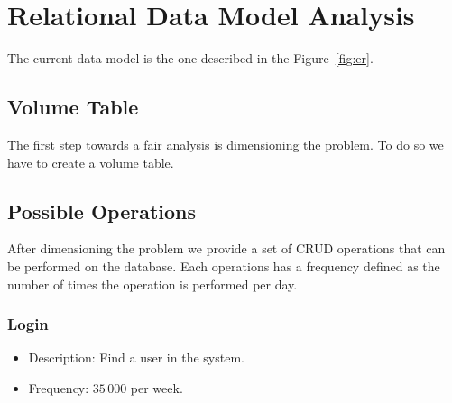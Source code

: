 \section{Relational Data Model Analysis}

The current data model is the one described in the Figure~\ref{fig:er}.

\subsection{Volume Table}

The first step towards a fair analysis is dimensioning the problem. To do so we
have to create a volume table.

\vspace{0.3cm}

\subsection{Possible Operations}

After dimensioning the problem we provide a set of CRUD operations that can be
performed on the database. Each operations has a frequency defined as the number
of times the operation is performed per day.

\subsubsection{Login}

\begin{itemize}
	\item Description: Find a user in the system.
	\item Frequency: \(35\,000\) per week.
\end{itemize}

